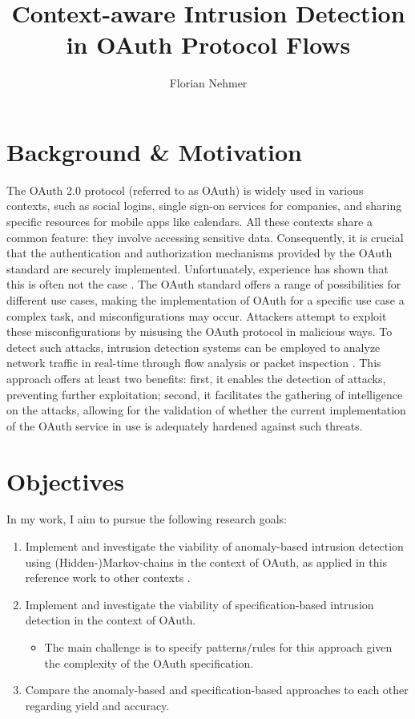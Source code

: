 \documentclass{article}
\title{Context-aware Intrusion Detection in OAuth Protocol Flows}
\author{Florian Nehmer}
\begin{document}
\maketitle

\section{Background \& Motivation}
The OAuth 2.0 protocol \cite{rfc6749} (referred to as OAuth) is widely used in various contexts, such as social logins, single sign-on services for companies, and sharing specific resources for mobile apps like calendars. All these contexts share a common feature: they involve accessing sensitive data. Consequently, it is crucial that the authentication and authorization mechanisms provided by the OAuth standard are securely implemented. Unfortunately, experience has shown that this is often not the case \cite{Li2019}. The OAuth standard offers a range of possibilities for different use cases, making the implementation of OAuth for a specific use case a complex task, and misconfigurations may occur. Attackers attempt to exploit these misconfigurations by misusing the OAuth protocol in malicious ways. To detect such attacks, intrusion detection systems can be employed to analyze network traffic in real-time through flow analysis or packet inspection \cite{Liu2019}. This approach offers at least two benefits: first, it enables the detection of attacks, preventing further exploitation; second, it facilitates the gathering of intelligence on the attacks, allowing for the validation of whether the current implementation of the OAuth service in use is adequately hardened against such threats.

\section{Objectives}
In my work, I aim to pursue the following research goals:
\begin{enumerate}
\item Implement and investigate the viability of anomaly-based intrusion detection using (Hidden-)Markov-chains in the context of OAuth, as applied in this reference work to other contexts \cite{sperotto2011}.
\item Implement and investigate the viability of specification-based intrusion detection in the context of OAuth.
\begin{itemize}
\item The main challenge is to specify patterns/rules for this approach given the complexity of the OAuth specification.
\end{itemize}
\item Compare the anomaly-based and specification-based approaches to each other regarding yield and accuracy.
\end{enumerate}
\end{document}
